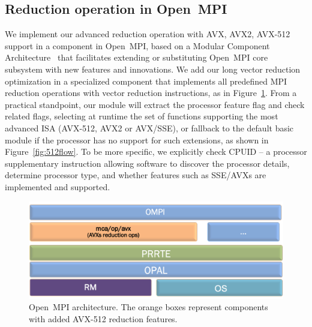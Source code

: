 \documentclass[5p,times,twocolumn]{elsarticle}
\newcommand{\ompi}[0]{Open~MPI\xspace}
\begin{document}
\subsection{Reduction operation in \ompi}
We implement our advanced reduction operation with AVX, AVX2, AVX-512
support in a component in \ompi, based on a Modular Component
Architecture~\cite{gabriel04ompi, dongprrte} that facilitates extending or
substituting \ompi core subsystem with new features and innovations.
We add our long vector reduction optimization in a specialized component that
implements all predefined MPI reduction operations with vector
reduction instructions, as in Figure~\ref{fig:avxmca}. From a
practical standpoint, our module will extract the processor
feature flag and check related flags, selecting at runtime the set of
functions supporting the most advanced ISA (AVX-512, AVX2 or AVX/SSE),
or fallback to the default basic module if the processor has no
support for such extensions, as shown in Figure~\ref{fig:512flow}.
%
To be more specific, we explicitly check CPUID -- a processor
supplementary instruction allowing software to discover the
processor details, determine processor type, and whether features such as
SSE/AVXs are implemented and supported.

\begin{figure}[h]
    \centering
    \includegraphics[width=\linewidth]{mca1.png}
    \caption{\ompi architecture. The orange boxes represent components with added AVX-512 reduction features.}
    \label{fig:avxmca}
\end{figure}
\end{document}
